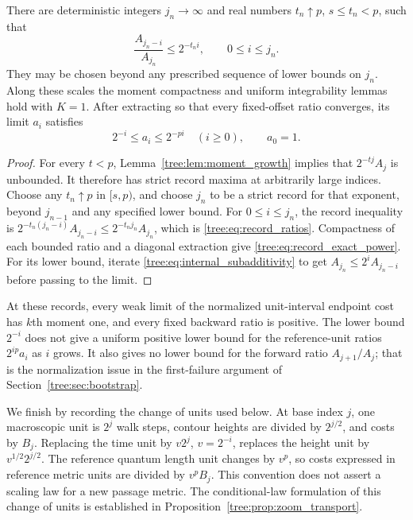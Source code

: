 \begin{lemma}\label{tree:lem:record_scales}
There are deterministic integers $j_n\to\infty$ and real numbers
$t_n\uparrow p$, $s\leq t_n<p$, such that
\begin{equation}\label{tree:eq:record_ratios}
 \frac{A_{j_n-i}}{A_{j_n}}\leq2^{-t_n i},
 \qquad 0\leq i\leq j_n.
\end{equation}
They may be chosen beyond any prescribed sequence of lower bounds
on $j_n$. Along these scales the moment compactness and uniform
integrability lemmas hold with $K=1$. After extracting so that
every fixed-offset ratio converges, its limit $a_i$ satisfies
\begin{equation}\label{tree:eq:record_exact_power}
 2^{-i}\leq a_i\leq2^{-pi}\quad(i\geq0),\qquad a_0=1.
\end{equation}
\end{lemma}

\begin{proof}
For every $t<p$, Lemma~\ref{tree:lem:moment_growth} implies that
$2^{-tj}A_j$ is unbounded. It therefore has strict record maxima
at arbitrarily large indices. Choose any $t_n\uparrow p$ in
$[s,p)$, and choose $j_n$ to be a strict record for that exponent,
beyond $j_{n-1}$ and any specified lower bound. For $0\leq i\leq
j_n$, the record inequality is
$2^{-t_n(j_n-i)}A_{j_n-i}\leq2^{-t_nj_n}A_{j_n}$, which is
\eqref{tree:eq:record_ratios}. Compactness of each bounded ratio and
a diagonal extraction give \eqref{tree:eq:record_exact_power}.
For its lower bound, iterate \eqref{tree:eq:internal_subadditivity} to get
$A_{j_n}\leq2^iA_{j_n-i}$ before passing to the limit.
\end{proof}

At these records, every weak limit of the normalized unit-interval endpoint
cost has $k$th moment one, and every fixed backward ratio is positive.
The lower bound $2^{-i}$ does not give a uniform positive lower bound
for the reference-unit ratios $2^{ip}a_i$ as $i$ grows. It also gives
no lower bound for the forward ratio $A_{j+1}/A_j$; that is the
normalization issue in the first-failure argument of
Section~\ref{tree:sec:bootstrap}.

We finish by recording the change of units used below. At base index
$j$, one macroscopic unit is $2^j$ walk steps, contour
heights are divided by $2^{j/2}$, and costs by $B_j$. Replacing
the time unit by $v2^j$, $v=2^{-i}$, replaces the height unit by
$v^{1/2}2^{j/2}$. The reference quantum length unit changes by
$v^p$, so costs expressed in reference metric units are divided
by $v^pB_j$. This convention does not assert a scaling law for a
new passage metric. The conditional-law formulation of this
change of units is established in
Proposition~\ref{tree:prop:zoom_transport}.
